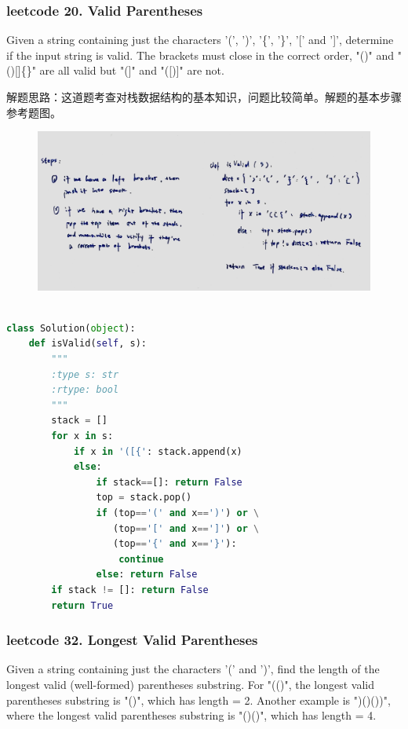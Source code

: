 \documentclass[a4paper,10pt]{article}
\begin{document}
\subsubsection{leetcode 20. Valid Parentheses}
Given a string containing just the characters '(', ')', '\{', '\}', '[' and ']', determine if the input string is valid. The brackets must close in the correct order, "()" and "()[]\{\}" are all valid but "(]" and "([)]" are not. \\

\begin{CJK*}{UTF8}{gbsn}
\noindent 解题思路：这道题考查对栈数据结构的基本知识，问题比较简单。解题的基本步骤参考题图。
\end{CJK*}

\begin{figure}[h]
    \includegraphics[width=\textwidth]{leetcode20.jpg}
    \centering
\end{figure}

\begin{lstlisting}[language=Python, caption=Problem20. Valid Parentheses]

class Solution(object):
    def isValid(self, s):
        """
        :type s: str
        :rtype: bool
        """
        stack = []
        for x in s:
            if x in '([{': stack.append(x)
            else:
                if stack==[]: return False
                top = stack.pop()
                if (top=='(' and x==')') or \
                   (top=='[' and x==']') or \
                   (top=='{' and x=='}'):
                    continue
                else: return False
        if stack != []: return False
        return True
\end{lstlisting}



\subsubsection{leetcode 32. Longest Valid Parentheses}
Given a string containing just the characters '(' and ')', find the length of the longest valid (well-formed) parentheses substring. For "(()", the longest valid parentheses substring is "()", which has length = 2. Another example is ")()())", where the longest valid parentheses substring is "()()", which has length = 4. \\
\end{document}
